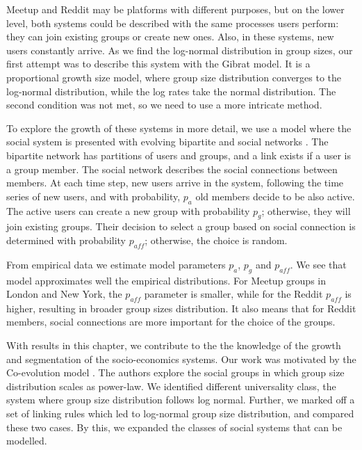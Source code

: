 Meetup and Reddit may be platforms with different purposes, but on the lower level, both systems could be described with the same processes users perform: they can join existing groups or create new ones. Also, in these systems, new users constantly arrive. As we find the log-normal distribution in group sizes, our first attempt was to describe this system with the Gibrat model. It is a proportional growth size model, where group size distribution converges to the log-normal distribution, while the log rates take the normal distribution. The second condition was not met, so we need to use a more intricate method.

To explore the growth of these systems in more detail, we use a model where the social system is presented with evolving bipartite and social networks \cite{zheleva2009co}. The bipartite network has partitions of users and groups, and a link exists if a user is a group member. The social network describes the social connections between members. At each time step, new users arrive in the system, following the time series of new users, and with probability, $p_a$ old members decide to be also active. The active users can create a new group with probability $p_g$; otherwise, they will join existing groups. Their decision to select a group based on social connection is determined with probability $p_{aff}$; otherwise, the choice is random. 

From empirical data we estimate model parameters $p_a$, $p_g$ and $p_{aff}$. We see that model approximates well the empirical distributions. For Meetup groups in London and New York, the $p_{aff}$ parameter is smaller, while for the Reddit $p_{aff}$ is higher, resulting in broader group sizes distribution. It also means that for Reddit members, social connections are more important for the choice of the groups. 

With results in this chapter, we contribute to the the knowledge of the growth and segmentation of the socio-economics systems. Our work was motivated by the Co-evolution model \cite{zheleva2009co}. The authors explore the social groups in which group size distribution scales as power-law. We identified different universality class, the system where group size distribution follows log normal. Further, we marked off a set of linking rules which led to log-normal group size distribution, and compared these two cases. By this, we expanded the classes of social systems that can be modelled.  



